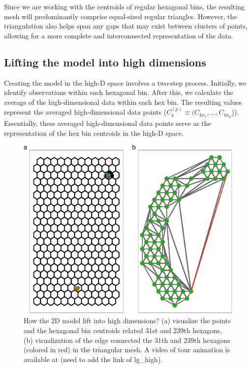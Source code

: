 \documentclass[
  12pt]{article}
\begin{document}
Since we are working with the centroids of regular hexagonal bins, the
resulting mesh will predominantly comprise equal-sized regular
triangles. However, the triangulation also helps span any gaps that may
exist between clusters of points, allowing for a more complete and
interconnected representation of the data.

\hypertarget{lifting-the-model-into-high-dimensions}{%
\subsection{Lifting the model into high
dimensions}\label{lifting-the-model-into-high-dimensions}}

Creating the model in the high-D space involves a two-step process.
Initially, we identify observations within each hexagonal bin. After
this, we calculate the average of the high-dimensional data within each
hex bin. The resulting values represent the averaged high-dimensional
data points (\(C_k^{(p)} \equiv (C_{kx_1}, ..., C_{kx_p}\))).
Essentially, these averaged high-dimensional data points serve as the
representation of the hex bin centroids in the high-D space.

\begin{figure}

{\centering \includegraphics{paper_files/figure-pdf/fig-wkhighD-1.pdf}

}

\caption{\label{fig-wkhighD}How the 2D model lift into high dimensions?
(a) visualize the points and the hexagonal bin centroids related 31st
and 239th hexagons, (b) visualization of the edge connected the 31th and
239th hexagons (colored in red) in the triangular mesh. A video of tour
animation is available at (need to add the link of lg\_high).}

\end{figure}
\end{document}
